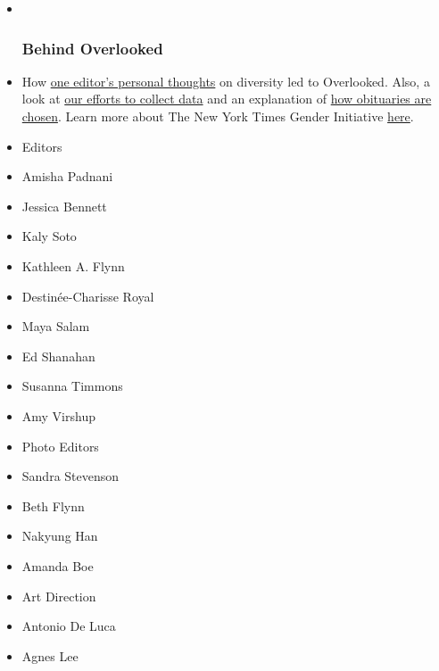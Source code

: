 \begin{itemize}
\item ~
  \hypertarget{behind-overlooked}{%
  \subsubsection{Behind Overlooked}\label{behind-overlooked}}
\item
  How
  \href{https://www.nytimes.com/2018/03/08/insider/overlooked-obituary.html}{one
  editor's personal thoughts} on diversity led to Overlooked. Also, a
  look at
  \href{https://www.nytimes.com/2018/03/14/insider/women-obituaries.html}{our
  efforts to collect data} and an explanation of
  \href{https://www.nytimes.com/2018/03/08/obituaries/overlooked-from-the-death-desk-why-most-obits-are-still-of-white-men.html}{how
  obituaries are chosen}. Learn more about The New York Times Gender
  Initiative
  \href{https://www.nytimes.com/2017/12/13/reader-center/jessica-bennett-our-new-gender-editor-answers-your-questions.html}{here}.
\end{itemize}

\begin{itemize}
\tightlist
\item
  Editors
\item
  Amisha Padnani
\item
  Jessica Bennett
\item
  Kaly Soto
\item
  Kathleen A. Flynn
\item
  Destinée-Charisse Royal
\item
  Maya Salam
\item
  Ed Shanahan
\item
  Susanna Timmons
\item
  Amy Virshup
\end{itemize}

\begin{itemize}
\tightlist
\item
  Photo Editors
\item
  Sandra Stevenson
\item
  Beth Flynn
\item
  Nakyung Han
\item
  Amanda Boe
\end{itemize}

\begin{itemize}
\tightlist
\item
  Art Direction
\item
  Antonio De Luca
\item
  Agnes Lee
\end{itemize}

